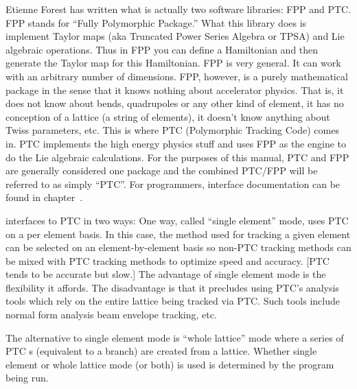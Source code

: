 Etienne Forest\cite{b:forest} has written what is actually two
software libraries: FPP and PTC.  FPP stands for ``Fully Polymorphic
Package.'' What this library does is implement Taylor maps (aka
Truncated Power Series Algebra or TPSA) and Lie algebraic
operations. Thus in FPP you can define a Hamiltonian and then generate
the Taylor map for this Hamiltonian. FPP is very general. It can work
with an arbitrary number of dimensions.  FPP, however, is a purely
mathematical package in the sense that it knows nothing about
accelerator physics. That is, it does not know about bends,
quadrupoles or any other kind of element, it has no conception of a
lattice (a string of elements), it doesn't know anything about Twiss
parameters, etc. This is where PTC (Polymorphic Tracking Code) comes
in. PTC implements the high energy physics stuff and uses FPP as
the engine to do the Lie algebraic calculations.  For the purposes of
this manual, PTC and FPP are generally considered one package and the
combined PTC/FPP will be referred to as simply ``PTC''.
For programmers, interface documentation can be found in
chapter~.

\bmad interfaces to PTC in two ways: One way, called ``single
element'' mode, uses PTC on a per element basis. In this case, the
method used for tracking a given element can be selected on an
element-by-element basis so non-PTC tracking methods can be mixed with
PTC tracking methods to optimize speed and accuracy. [PTC tends to be
accurate but slow.] The advantage of single element mode is the
flexibility it affords. The disadvantage is that it precludes using
PTC's analysis tools which rely on the entire lattice being tracked
via PTC. Such tools include normal form analysis beam envelope
tracking, etc.

The alternative to single element mode is ``whole lattice'' mode where
a series of PTC s (equivalent to a \bmad branch) are
created from a \bmad lattice. Whether single element or whole lattice
mode (or both) is used is determined by the program being run.

